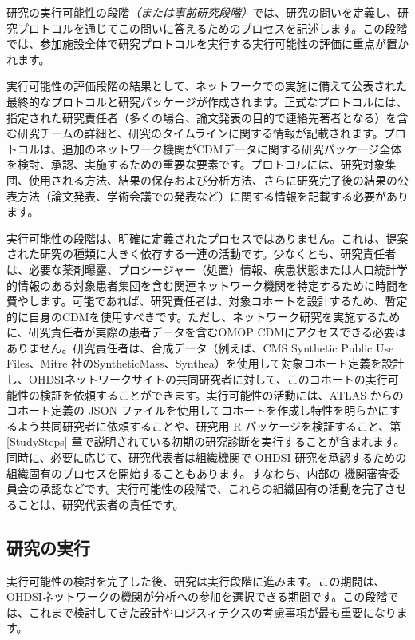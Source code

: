 \documentclass[
  11pt]{book}
\theoremstyle{definition}
\theoremstyle{definition}
\theoremstyle{definition}
\theoremstyle{definition}
\theoremstyle{remark}
\begin{document}
研究の実行可能性の段階\emph{（または事前研究段階）}では、研究の問いを定義し、研究プロトコルを通じてこの問いに答えるためのプロセスを記述します。この段階では、参加施設全体で研究プロトコルを実行する実行可能性の評価に重点が置かれます。

実行可能性の評価段階の結果として、ネットワークでの実施に備えて公表された最終的なプロトコルと研究パッケージが作成されます。正式なプロトコルには、指定された研究責任者（多くの場合、論文発表の目的で連絡先著者となる）を含む研究チームの詳細と、研究のタイムラインに関する情報が記載されます。プロトコルは、追加のネットワーク機関がCDMデータに関する研究パッケージ全体を検討、承認、実施するための重要な要素です。プロトコルには、研究対象集団、使用される方法、結果の保存および分析方法、さらに研究完了後の結果の公表方法（論文発表、学術会議での発表など）に関する情報を記載する必要があります。

実行可能性の段階は、明確に定義されたプロセスではありません。これは、提案された研究の種類に大きく依存する一連の活動です。少なくとも、研究責任者は、必要な薬剤曝露、プロシージャー（処置）情報、疾患状態または人口統計学的情報のある対象患者集団を含む関連ネットワーク機関を特定するために時間を費やします。可能であれば、研究責任者は、対象コホートを設計するため、暫定的に自身のCDMを使用すべきです。ただし、ネットワーク研究を実施するために、研究責任者が実際の患者データを含むOMOP CDMにアクセスできる必要はありません。研究責任者は、合成データ（例えば、CMS Synthetic Public Use Files、Mitre 社のSyntheticMass、Synthea）を使用して対象コホート定義を設計し、OHDSIネットワークサイトの共同研究者に対して、このコホートの実行可能性の検証を依頼することができます。実行可能性の活動には、ATLAS からのコホート定義の JSON ファイルを使用してコホートを作成し特性を明らかにするよう共同研究者に依頼することや、研究用 R パッケージを検証すること、第 \ref{StudySteps} 章で説明されている初期の研究診断を実行することが含まれます。同時に、必要に応じて、研究代表者は組織機関で OHDSI 研究を承認するための組織固有のプロセスを開始することもあります。すなわち、内部の 機関審査委員会の承認などです。実行可能性の段階で、これらの組織固有の活動を完了させることは、研究代表者の責任です。

\subsection{研究の実行}\label{ux7814ux7a76ux306eux5b9fux884c-1}

実行可能性の検討を完了した後、研究は実行段階に進みます。この期間は、OHDSIネットワークの機関が分析への参加を選択できる期間です。この段階では、これまで検討してきた設計やロジスィテクスの考慮事項が最も重要になります。
\end{document}
